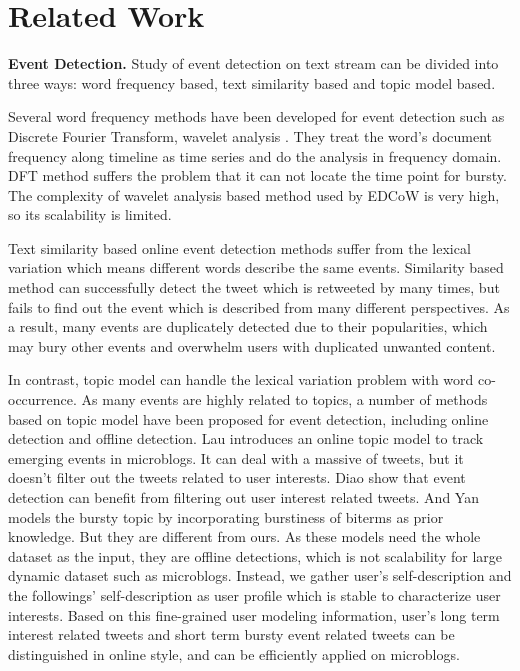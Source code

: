 \documentclass[runningheads,a4paper]{llncs}
\begin{document}

\section{Related Work}
\textbf{Event Detection.} Study of event detection on text stream can be divided into three ways: word frequency based, text similarity based and topic model based.

Several word frequency methods have been developed for event detection such as Discrete Fourier Transform\cite{he2007analyzingDFT}, wavelet analysis \cite{weng2011eventWavelet}.
They treat the word's document frequency along timeline as time series and do the analysis in frequency domain. 
DFT method suffers the problem that it can not locate the time point for bursty.
The complexity of wavelet analysis based method used by EDCoW\cite{weng2011eventWavelet} is very high, so its scalability is limited. 

 Text similarity based online event detection methods\cite{petrovic2010streaming}\cite{mccreadiescalable}  suffer from the lexical variation which means different words describe the same events.
 Similarity based method can successfully detect the tweet which is retweeted by many times, but fails to find out the event which is described from many different perspectives.
 As a result, many events are duplicately detected due to their popularities, which may bury other events and overwhelm users with duplicated unwanted content.


In contrast, topic model can handle the lexical variation problem with word co-occurrence\cite{blei2003latent}.
As many events are highly related to topics, a number of methods based on topic model have been proposed for event detection, including online detection and offline detection.
Lau\cite{lau2012line} introduces an online topic model to track emerging events in microblogs.
It can deal with a massive of tweets, but it doesn't filter out the tweets related to user interests.
Diao\cite{timeUserLDA2012finding}\cite{diao2013unified} show that event detection can benefit from filtering out user interest related tweets. 
And Yan\cite{Yan:2015wm} models the bursty topic by incorporating burstiness of biterms as prior knowledge.
But they are different from ours.
As these models need the whole dataset as the input, they are offline detections, which is not scalability for large dynamic dataset such as microblogs.
Instead, we gather user's self-description and the followings' self-description as user profile which is stable to characterize user interests. 
Based on this fine-grained user modeling information, user's long term interest related tweets and short term bursty event related tweets can be distinguished in online style, and can be efficiently applied on microblogs.
\end{document}
